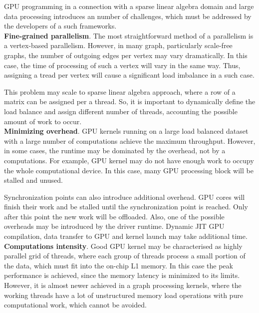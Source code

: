 GPU programming in a connection with a sparse linear algebra domain and large data processing introduces an number of challenges, which must be addressed by the developers of a such frameworks.\\

\textbf{Fine-grained parallelism}. The most straightforward method of a parallelism is a vertex-based parallelism. However, in many graph, particularly scale-free graphs, the number of outgoing edges per vertex may vary dramatically. In this case, the time of processing of such a vertex will vary in the same way. Thus, assigning a tread per vertex will cause a significant load imbalance in a such case. 

This problem may scale to sparse linear algebra approach, where a row of a matrix can be assigned per a thread. So, it is important to dynamically define the load balance and assign different number of threads, accounting the possible amount of work to occur.\\

\textbf{Minimizing overhead}. GPU kernels running on a large load balanced dataset with a large number of computations achieve the maximum throughput. However, in some cases, the runtime may be dominated by the overhead, not by a computations. For example, GPU kernel may do not have enough work to occupy the whole computational device. In this case, many GPU processing block will be stalled and unused. 

Synchronization points can also introduce additional overhead. GPU cores will finish their work and be stalled until the synchronization point is reached. Only after this point the new work will be offloaded. Also, one of the possible overheads may be introduced by the driver runtime. Dynamic JIT GPU compilation, data transfer to GPU and kernel launch may take additional time.\\

\textbf{Computations intensity}. Good GPU kernel may be characterised as highly parallel grid of threads, where each group of threads process a small portion of the data, which must fit into the on-chip L1 memory. In this case the peak performance is achieved, since the memory latency is minimized to its limits. However, it is almost newer achieved in a graph processing kernels, where the working threads have a lot of unstructured memory load operations with pure computational work, which cannot be avoided.\\
